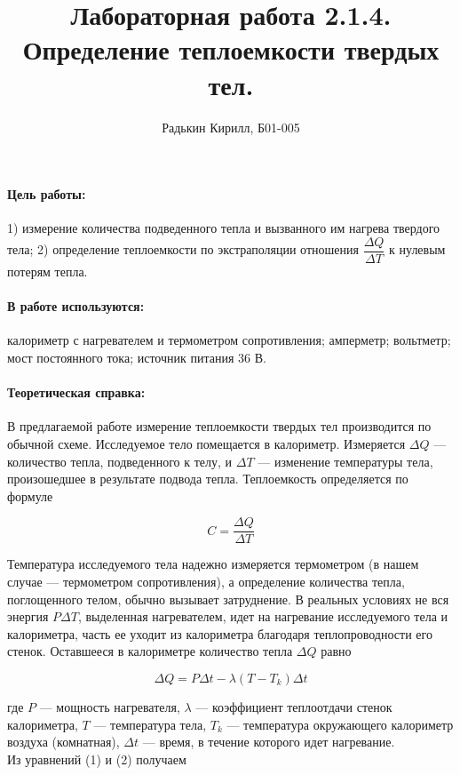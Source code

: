 \documentclass[12pt,a4paper]{article}
\author{Радькин Кирилл, Б01-005}
\title{Лабораторная работа 2.1.4. Определение теплоемкости твердых тел.}
\begin{document}
	\maketitle
	
	\paragraph* {Цель работы:} 1) измерение количества подведенного тепла и вызванного им нагрева твердого тела; 2) определение теплоемкости по экстраполяции отношения $\dfrac{\Delta Q}{\Delta T}$ к нулевым потерям тепла.
	
	\paragraph* {В работе используются:} калориметр с нагревателем и термометром сопротивления; амперметр; вольтметр; мост постоянного тока; источник питания 36 В.
	
	\paragraph* {Теоретическая справка:} В предлагаемой работе измерение теплоемкости твердых тел производится по обычной схеме. Исследуемое тело помещается в калориметр. Измеряется $\Delta Q$ — количество тепла, подведенного к телу, и $\Delta T$ — изменение температуры тела, произошедшее в результате подвода тепла. Теплоемкость определяется по формуле
	
	\begin{equation}
		C = \dfrac{\Delta Q}{\Delta T}
	\end{equation}
	
	Температура исследуемого тела надежно измеряется термометром (в нашем случае — термометром сопротивления), а определение количества тепла, поглощенного телом, обычно вызывает затруднение. В реальных условиях не вся энергия $P \Delta T$, выделенная нагревателем, идет на нагревание исследуемого тела и калориметра, часть ее уходит из калориметра благодаря теплопроводности его стенок. Оставшееся в калориметре количество тепла $\Delta Q$ равно
	
	\begin{equation}
		\Delta Q = P \Delta t - \lambda(T - T_k)\Delta t
	\end{equation}
	
	где $P$ — мощность нагревателя, $\lambda$ — коэффициент теплоотдачи стенок калориметра, $T$ — температура тела, $T_k$ — температура окружающего калориметр воздуха (комнатная), $\Delta t$ — время, в течение которого идет нагревание.\\
	Из уравнений (1) и (2) получаем
	
\end{document}
